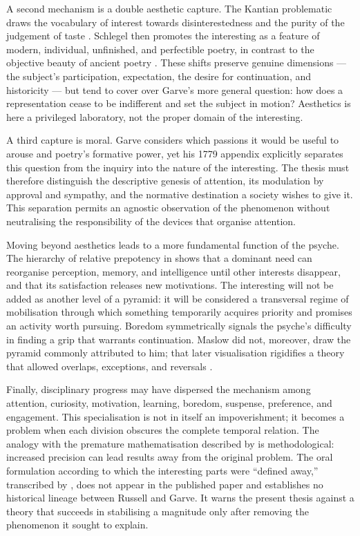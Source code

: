 \documentclass[11pt,a4paper]{article}
\begin{document}
A second mechanism is a double aesthetic capture. The Kantian problematic draws
the vocabulary of interest towards disinterestedness and the purity of the
judgement of taste \parencite{kant1993juger}. Schlegel then promotes the
interesting as a feature of modern, individual, unfinished, and perfectible
poetry, in contrast to the objective beauty of ancient poetry
\parencite{schlegel2001study,nannini2018interesting}. These shifts preserve
genuine dimensions --- the subject's participation, expectation, the desire for
continuation, and historicity --- but tend to cover over Garve's more general
question: how does a representation cease to be indifferent and set the subject
in motion? Aesthetics is here a privileged laboratory, not the proper domain of
the interesting.

A third capture is moral. Garve considers which passions it would be useful to
arouse and poetry's formative power, yet his 1779 appendix explicitly separates
this question from the inquiry into the nature of the interesting. The thesis
must therefore distinguish the descriptive genesis of attention, its modulation
by approval and sympathy, and the normative destination a society wishes to give
it. This separation permits an agnostic observation of the phenomenon without
neutralising the responsibility of the devices that organise attention.

Moving beyond aesthetics leads to a more fundamental function of the psyche.
The hierarchy of relative prepotency in \textcite{maslow1943motivation} shows
that a dominant need can reorganise perception, memory, and intelligence until
other interests disappear, and that its satisfaction releases new motivations.
The interesting will not be added as another level of a pyramid: it will be
considered a transversal regime of mobilisation through which something
temporarily acquires priority and promises an activity worth pursuing. Boredom
symmetrically signals the psyche's difficulty in finding a grip that warrants
continuation. Maslow did not, moreover, draw the pyramid commonly attributed to
him; that later visualisation rigidifies a theory that allowed overlaps,
exceptions, and reversals \parencite{bridgman2019maslow}.

Finally, disciplinary progress may have dispersed the mechanism among attention,
curiosity, motivation, learning, boredom, suspense, preference, and engagement.
This specialisation is not in itself an impoverishment; it becomes a problem
when each division obscures the complete temporal relation. The analogy with
the premature mathematisation described by \textcite{russell1995rationality} is
methodological: increased precision can lead results away from the original
problem. The oral formulation according to which the interesting parts were
``defined away,'' transcribed by \textcite{pachet1997representation}, does not
appear in the published paper and establishes no historical lineage between
Russell and Garve. It warns the present thesis against a theory that succeeds in
stabilising a magnitude only after removing the phenomenon it sought to explain.
\end{document}
